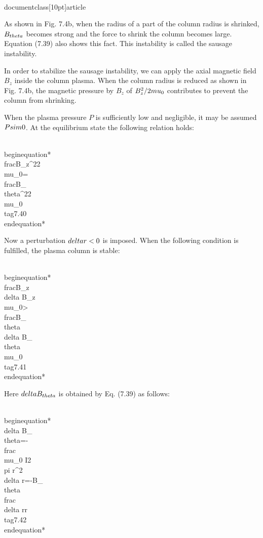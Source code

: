 \\documentclass[10pt]{article}
\begin{document}
{{{{As shown in Fig. 7.4b, when the radius of a part of the column radius is shrinked, $B_{\\theta}$ becomes strong and the force to shrink the column becomes large. Equation (7.39) also shows this fact. This instability is called the sausage instability.

In order to stabilize the sausage instability, we can apply the axial magnetic field $B_{z}$ inside the column plasma. When the column radius is reduced as shown in Fig. 7.4b, the magnetic pressure by $B_{z}$ of $B_{z}^{2} / 2 \\mu_{0}$ contributes to prevent the column from shrinking.

When the plasma pressure $P$ is sufficiently low and negligible, it may be assumed $P \\sim 0$. At the equilibrium state the following relation holds:


\\begin{equation*}
\\frac{B_{z}^{2}}{2 \\mu_{0}}=\\frac{B_{\\theta}^{2}}{2 \\mu_{0}} \\tag{7.40}
\\end{equation*}


Now a perturbation $\\delta r<0$ is imposed. When the following condition is fulfilled, the plasma column is stable:


\\begin{equation*}
\\frac{B_{z} \\delta B_{z}}{\\mu_{0}}>\\frac{B_{\\theta} \\delta B_{\\theta}}{\\mu_{0}} \\tag{7.41}
\\end{equation*}


Here $\\delta B_{\\theta}$ is obtained by Eq. (7.39) as follows:


\\begin{equation*}
\\delta B_{\\theta}=-\\frac{\\mu_{0} I}{2 \\pi r^{2}} \\delta r=-B_{\\theta} \\frac{\\delta r}{r} \\tag{7.42}
\\end{equation*}


}}}}
\end{document}
